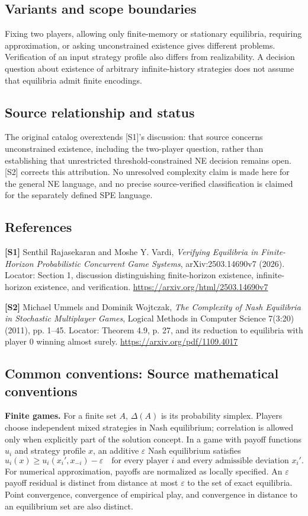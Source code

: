 \documentclass[11pt,a4paper]{article}
\begin{document}
\subsection*{Variants and scope boundaries}
Fixing two players, allowing only finite-memory or stationary equilibria, requiring approximation, or asking unconstrained existence gives different problems. Verification of an input strategy profile also differs from realizability. A decision question about existence of arbitrary infinite-history strategies does not assume that equilibria admit finite encodings.
\subsection*{Source relationship and status}
The original catalog overextends [S1]'s discussion: that source concerns unconstrained existence, including the two-player question, rather than establishing that unrestricted threshold-constrained NE decision remains open. [S2] corrects this attribution. No unresolved complexity claim is made here for the general NE language, and no precise source-verified classification is claimed for the separately defined SPE language.
\subsection*{References}
\begingroup\footnotesize\raggedright
\textbf{[S1]} Senthil Rajasekaran and Moshe Y. Vardi, \emph{Verifying Equilibria in Finite-Horizon Probabilistic Concurrent Game Systems}, arXiv:2503.14690v7 (2026). Locator: Section 1, discussion distinguishing finite-horizon existence, infinite-horizon existence, and verification. \url{https://arxiv.org/html/2503.14690v7}

\textbf{[S2]} Michael Ummels and Dominik Wojtczak, \emph{The Complexity of Nash Equilibria in Stochastic Multiplayer Games}, Logical Methods in Computer Science 7(3:20) (2011), pp. 1--45. Locator: Theorem 4.9, p. 27, and its reduction to equilibria with player 0 winning almost surely. \url{https://arxiv.org/pdf/1109.4017}
\par\endgroup

\subsection*{Common conventions: Source mathematical conventions}

\textbf{Finite games.} For a finite set $A$, $\Delta(A)$ is its probability
simplex. Players choose independent mixed strategies in Nash equilibrium;
correlation is allowed only when explicitly part of the solution concept.
In a game with payoff functions $u_i$ and strategy profile $x$, an additive
$\varepsilon$ Nash equilibrium satisfies
\[
 u_i(x)\geq u_i(x_i',x_{-i})-\varepsilon
 \quad\text{for every player $i$ and every admissible deviation $x_i'$}.
\]
For numerical approximation, payoffs are normalized as locally specified.
An $\varepsilon$ payoff residual is distinct from distance at most
$\varepsilon$ to the set of exact equilibria. Point convergence, convergence
of empirical play, and convergence in distance to an equilibrium set are
also distinct.
\end{document}
